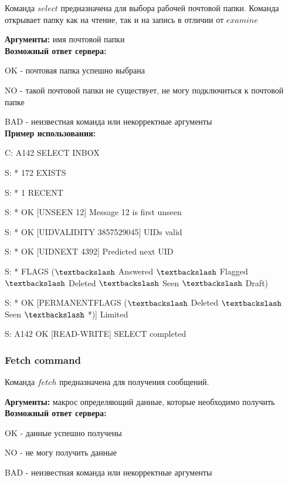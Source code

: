 \documentclass[a4paper,14pt]{extarticle}
\begin{document}
        Команда $select$ предназначена для выбора рабочей почтовой папки.
        Команда открывает папку как на чтение, так и на запись в отличии от $examine$

        \textbf{Аргументы:}  имя почтовой папки \\

        \textbf{Возможный ответ сервера:}

        OK - почтовая папка успешно выбрана

        NO - такой почтовой папки не существует, не могу подключиться к почтовой папке

        BAD - неизвестная команда или некорректные аргументы \\


        \textbf{Пример использования:}  

        C: A142 SELECT INBOX

        S: * 172 EXISTS

        S: * 1 RECENT

        S: * OK [UNSEEN 12] Message 12 is first unseen

        S: * OK [UIDVALIDITY 3857529045] UIDs valid

        S: * OK [UIDNEXT 4392] Predicted next UID

        S: * FLAGS ($\textbackslash$ Answered $\textbackslash$ Flagged
        $\textbackslash$ Deleted $\textbackslash$ Seen $\textbackslash$ Draft)

        S: * OK [PERMANENTFLAGS ($\textbackslash$ Deleted $\textbackslash$ Seen $\textbackslash$ *)] Limited

        S: A142 OK [READ-WRITE] SELECT completed


    \subsubsection{Fetch command}

        Команда $fetch$ предназначена для получения сообщений.

        \textbf{Аргументы:}  макрос определяющий данные, которые необходимо получить \\

        \textbf{Возможный ответ сервера:}

        OK - данные успешно получены

        NO - не могу получить данные

        BAD - неизвестная команда или некорректные аргументы \\
\end{document}
